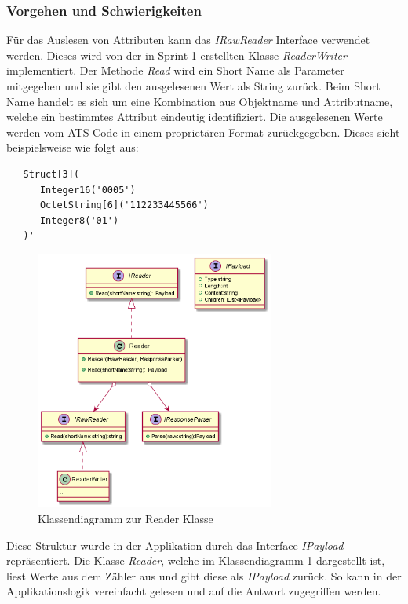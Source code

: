 \subsubsection{Vorgehen und Schwierigkeiten}\label{readAttributVorgehen}
Für das Auslesen von Attributen kann das \textit{IRawReader} Interface verwendet werden.
Dieses wird von der in Sprint 1 erstellten Klasse \textit{ReaderWriter} implementiert.
Der Methode \textit{Read} wird ein Short Name als Parameter mitgegeben und sie gibt den ausgelesenen Wert als String zurück.
Beim Short Name handelt es sich um eine Kombination aus Objektname und Attributname, welche ein bestimmtes Attribut eindeutig identifiziert.
Die ausgelesenen Werte werden vom \ac{ATS} Code in einem proprietären Format zurückgegeben. 
Dieses sieht beispielsweise wie folgt aus:
\begin{verbatim}
   Struct[3](
      Integer16('0005')
      OctetString[6]('112233445566')
      Integer8('01')
   )'
\end{verbatim}
\begin{figure}
\centering
\includegraphics[width=0.7\textwidth]{gfx/string_toPayload.png}
\caption{
   Klassendiagramm zur Reader Klasse
   }
   \label{fig:reader}
\end{figure}
Diese Struktur wurde in der Applikation durch das Interface \textit{IPayload} repräsentiert.
Die Klasse \textit{Reader}, welche im Klassendiagramm \ref{fig:reader} dargestellt ist, liest Werte aus dem Zähler aus und gibt diese als \textit{IPayload} zurück.
So kann in der Applikationslogik vereinfacht gelesen und auf die Antwort zugegriffen werden.

